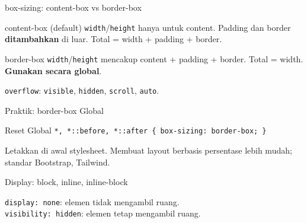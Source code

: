 \documentclass[handout]{beamer}
\begin{document}
\begin{frame}{box-sizing: content-box vs border-box}
	\begin{block}{content-box (default)}
		\texttt{width}/\texttt{height} hanya untuk content. Padding dan border \textbf{ditambahkan} di luar. Total = width + padding + border.
	\end{block}
	\begin{block}{border-box}
		\texttt{width}/\texttt{height} mencakup content + padding + border. Total = width. \textbf{Gunakan secara global}.
	\end{block}
	\texttt{overflow}: \texttt{visible}, \texttt{hidden}, \texttt{scroll}, \texttt{auto}.
\end{frame}

\begin{frame}{Praktik: border-box Global}
	\begin{block}{Reset Global}
		\texttt{*, *::before, *::after \{ box-sizing: border-box; \}}
	\end{block}
	Letakkan di awal stylesheet. Membuat layout berbasis persentase lebih mudah; standar Bootstrap, Tailwind.
\end{frame}

\begin{frame}{Display: block, inline, inline-block}
	\vspace{0.5em}
	\raggedright
	\texttt{display: none}: elemen tidak mengambil ruang.\\
	\texttt{visibility: hidden}: elemen tetap mengambil ruang.
\end{frame}
\end{document}
